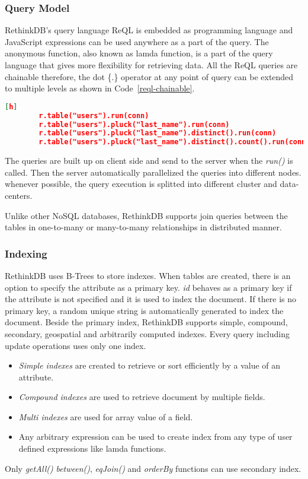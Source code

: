 \subsubsection{Query Model}
RethinkDB's query language ReQL is embedded as programming language and JavaScript expressions can be used anywhere as a part of the query. The anonymous function, also known as lamda function, is a part of the query language that gives more flexibility for retrieving data. All the ReQL queries are chainable therefore, the dot \{.\} operator at any point of query can be extended to multiple levels as shown in Code~\ref{reql-chainable}.
	\begin{lstlisting}[language=JSON,caption=Chainable Query in ReQL, label=reql-chainable, xleftmargin=-40pt][h]
		r.table("users").run(conn)
		r.table("users").pluck("last_name").run(conn)
		r.table("users").pluck("last_name").distinct().run(conn)
		r.table("users").pluck("last_name").distinct().count().run(conn)
	\end{lstlisting} 
The queries are built up on client side and send to the server when the \textit{run()} is called. Then the server automatically parallelized the queries into different nodes. whenever possible, the query execution is splitted into different cluster and data-centers.
\par
Unlike other NoSQL databases, RethinkDB supports join queries between the tables in one-to-many or many-to-many relationships in distributed manner. 
\subsubsection{Indexing}
	RethinkDB uses B-Trees to store indexes. When tables are created, there is an option to specify the attribute as a primary key. \textit{id} behaves as a primary key if the attribute is not specified and it is used to index the document. If there is no  primary key, a random unique string is automatically generated to index the document. Beside the primary index, RethinkDB supports simple, compound, secondary, geospatial  and arbitrarily computed indexes. Every query including update operations uses only one index. 
	\begin{itemize}
		\item \textit{Simple indexes} are created to retrieve or sort efficiently by a value of an attribute.
		\item \textit{Compound indexes} are used to retrieve document by multiple fields. 
		\item\textit{ Multi indexes } are used for array value of a field. 
		\item Any arbitrary expression can be used to create index from any type of user defined expressions like lamda functions.
	\end{itemize}
	 Only \textit{getAll()} \textit{between()}, \textit{eqJoin()} and \textit{orderBy} functions can use secondary index.